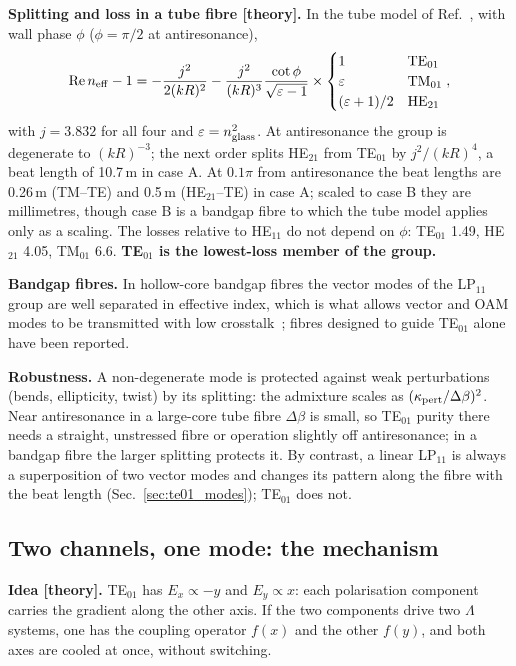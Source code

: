 \documentclass[11pt,a4paper]{article}
\begin{document}
\textbf{Splitting and loss in a tube fibre [theory].} In the tube model of Ref.~\cite{zeisberger2017}, with wall phase $\phi$ ($\phi=\pi/2$ at antiresonance),
\begin{equation}
  {\rm Re}\,n_{\rm eff}-1=-\frac{j^2}{2(kR)^2}-\frac{j^2}{(kR)^3}\frac{\cot\phi}{\sqrt{\varepsilon-1}}\times\begin{cases}1&{\rm TE}_{01}\\ \varepsilon&{\rm TM}_{01}\\ (\varepsilon+1)/2&{\rm HE}_{21}\end{cases},
\end{equation}
with $j=3.832$ for all four and $\varepsilon=n_{\rm glass}^2$. At antiresonance the group is degenerate to $(kR)^{-3}$; the next order splits HE$_{21}$ from TE$_{01}$ by $j^2/(kR)^4$, a beat length of 10.7\,m in case A. At $0.1\pi$ from antiresonance the beat lengths are 0.26\,m (TM--TE) and 0.5\,m (HE$_{21}$--TE) in case A; scaled to case B they are millimetres, though case B is a bandgap fibre to which the tube model applies only as a scaling. The losses relative to HE$_{11}$ do not depend on $\phi$: TE$_{01}$ 1.49, HE$_{21}$ 4.05, TM$_{01}$ 6.6. \textbf{TE$_{01}$ is the lowest-loss member of the group.}

\textbf{Bandgap fibres.} In hollow-core bandgap fibres the vector modes of the LP$_{11}$ group are well separated in effective index, which is what allows vector and OAM modes to be transmitted with low crosstalk~\cite{li2016oam}; fibres designed to guide TE$_{01}$ alone have been reported.

\textbf{Robustness.} A non-degenerate mode is protected against weak perturbations (bends, ellipticity, twist) by its splitting: the admixture scales as $(\kappa_{\rm pert}/\Delta\beta)^2$. Near antiresonance in a large-core tube fibre $\Delta\beta$ is small, so TE$_{01}$ purity there needs a straight, unstressed fibre or operation slightly off antiresonance; in a bandgap fibre the larger splitting protects it. By contrast, a linear LP$_{11}$ is always a superposition of two vector modes and changes its pattern along the fibre with the beat length (Sec.~\ref{sec:te01_modes}); TE$_{01}$ does not.

\subsection{Two channels, one mode: the mechanism}
\label{sec:te01_mech}
\textbf{Idea [theory].} TE$_{01}$ has $E_x\propto-y$ and $E_y\propto x$: each polarisation component carries the gradient along the other axis. If the two components drive two $\Lambda$ systems, one has the coupling operator $f(x)$ and the other $f(y)$, and both axes are cooled at once, without switching.
\end{document}
